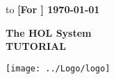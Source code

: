 

\begin{titlepage}
\null\vskip-47pt
\hbox to \textwidth
{\bf [For \holn{} \holnversion] { \hfil \today}}

\setcounter{page}{1}                      %

\vspace*{60mm}


\begin{center}
 {\Huge\bf The HOL System}\\[0.4cm]
{\LARGE\bf TUTORIAL}\\[2.5cm]
\end{center}

\begin{center}
\texttt{[image: ../Logo/logo]}
\end{center}


\vfill
\end{titlepage}

\thispagestyle{empty}
\mbox{}
\newpage






